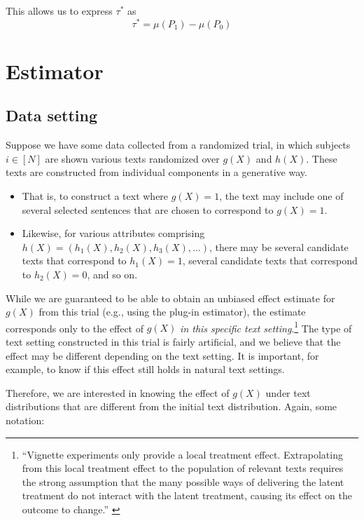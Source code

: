 \documentclass{article}
\begin{document}
This allows us to express $\tau^*$ as
\begin{equation*}
    \boxed{\tau^* = \mu(P_1)-\mu(P_0)}
\end{equation*}

\section{Estimator}

\subsection{Data setting}

Suppose we have some data collected from a randomized trial, in which subjects $i \in [N]$ are shown various texts randomized over $g(X)$ and $h(X)$. These texts are constructed from individual components in a generative way. 
\begin{itemize}
    \item That is, to construct a text where $g(X)=1$, the text may include one of several selected sentences that are chosen to correspond to $g(X)=1$.
    \item Likewise, for various attributes comprising $h(X)=(h_1(X), h_2(X), h_3(X), \dots)$, there may be several candidate texts that correspond to $h_1(X)=1$, several candidate texts that correspond to $h_2(X)=0$, and so on.
\end{itemize}

While we are guaranteed to be able to obtain an unbiased effect estimate for $g(X)$ from this trial (e.g., using the plug-in estimator), the estimate corresponds only to the effect of $g(X)$ \textit{in this specific text setting}.\footnote{``Vignette experiments only provide a local treatment effect. Extrapolating from this local treatment effect to the population of relevant texts requires the strong assumption that the many possible ways of delivering
the latent treatment do not interact with the latent treatment, causing its effect on the outcome to change.'' \cite{fong2021causal}} The type of text setting constructed in this trial is fairly artificial, and we believe that the effect may be different depending on the text setting. It is important, for example, to know if this effect still holds in natural text settings.

Therefore, we are interested in knowing the effect of $g(X)$ under text distributions that are different from the initial text distribution. Again, some notation:
\end{document}
